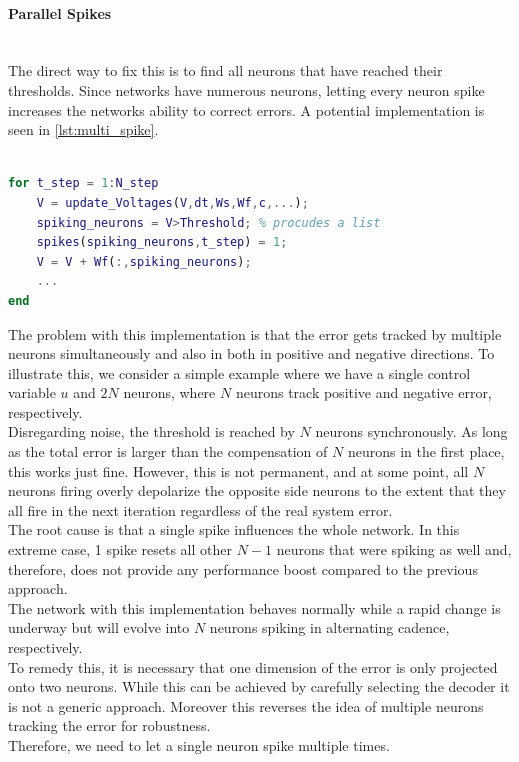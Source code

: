 \paragraph{Parallel Spikes}\mbox{}\\
The direct way to fix this is to find all neurons that have reached their thresholds. Since networks have numerous neurons, letting every neuron spike increases the networks ability to correct errors. A potential implementation is seen in \cref{lst:multi_spike}.
\begin{lstlisting}[language=Matlab, caption=Letting every neuron spike in parallel,label=lst:multi_spike]

for t_step = 1:N_step
	V = update_Voltages(V,dt,Ws,Wf,c,...);
	spiking_neurons = V>Threshold; % procudes a list
	spikes(spiking_neurons,t_step) = 1;
	V = V + Wf(:,spiking_neurons);
	...
end
\end{lstlisting}
The problem with this implementation is that the error gets tracked by multiple neurons simultaneously and also in both in positive and negative directions. To illustrate this, we consider a simple example where we have a single control variable $u$ and $2N$ neurons, where $N$ neurons track positive and negative error, respectively.\\
Disregarding noise, the threshold is reached by $N$ neurons synchronously. As long as the total error is larger than the compensation of $N$ neurons in the first place, this works just fine. However, this is not permanent, and at some point, all $N$ neurons firing overly depolarize the opposite side neurons to the extent that they all fire in the next iteration regardless of the real system error.\\
The root cause is that a single spike influences the whole network. In this extreme case, 1 spike resets all other $N-1$ neurons that were spiking as well and, therefore, does not provide any performance boost compared to the previous approach.\\
The network with this implementation behaves normally while a rapid change is underway but will evolve into $N$ neurons spiking in alternating cadence, respectively.\\
To remedy this, it is necessary that one dimension of the error is only projected onto two neurons. While this can be achieved by carefully selecting the decoder it is not a generic approach. Moreover this reverses the idea of multiple neurons tracking the error for robustness.\\
Therefore, we need to let a single neuron spike multiple times.

